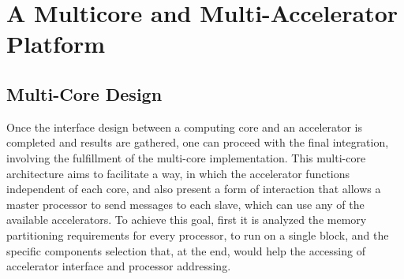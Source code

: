 \chapter{A Multicore and Multi-Accelerator Platform}
\label{ch:multicore}

\section{Multi-Core Design}

Once the interface design between a computing core and an accelerator is 
completed and results are gathered, one can proceed with the final integration, 
involving the fulfillment of the multi-core implementation.
This multi-core architecture aims to facilitate a way, in which the accelerator
functions independent of each core, and also present a form of interaction that
allows a master processor to send messages to each slave, which can use any of 
the available accelerators. To achieve this goal,
first it is analyzed the memory partitioning requirements for every processor,
to run on a single block, and the specific components selection that, at the
end, would help the accessing of accelerator interface and processor
addressing.
